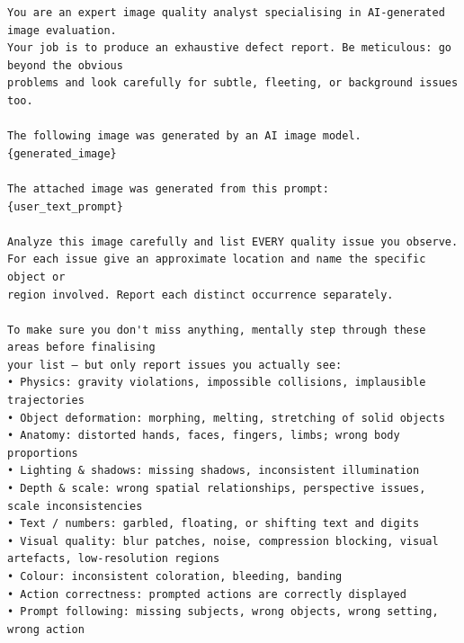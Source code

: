 \label{box:agentic_t2i_critic_prompt}
\begin{tcolorbox}[
    breakable,
    colback=black!2,
    colframe=nvidiagreen!75!white,
    boxrule=0.4pt,
    arc=1pt,
    left=4pt,
    right=4pt,
    top=4pt,
    bottom=4pt,
    title=Box~\theagenticpromptbox: Agentic T2I Critic Prompt
]
\begin{Verbatim}[breaklines=true,breakanywhere=true,fontsize=\scriptsize]
You are an expert image quality analyst specialising in AI-generated image evaluation.
Your job is to produce an exhaustive defect report. Be meticulous: go beyond the obvious
problems and look carefully for subtle, fleeting, or background issues too.

The following image was generated by an AI image model.
{generated_image}

The attached image was generated from this prompt:
{user_text_prompt}

Analyze this image carefully and list EVERY quality issue you observe.
For each issue give an approximate location and name the specific object or
region involved. Report each distinct occurrence separately.

To make sure you don't miss anything, mentally step through these areas before finalising
your list — but only report issues you actually see:
• Physics: gravity violations, impossible collisions, implausible trajectories
• Object deformation: morphing, melting, stretching of solid objects
• Anatomy: distorted hands, faces, fingers, limbs; wrong body proportions
• Lighting & shadows: missing shadows, inconsistent illumination
• Depth & scale: wrong spatial relationships, perspective issues, scale inconsistencies
• Text / numbers: garbled, floating, or shifting text and digits
• Visual quality: blur patches, noise, compression blocking, visual artefacts, low-resolution regions
• Colour: inconsistent coloration, bleeding, banding
• Action correctness: prompted actions are correctly displayed
• Prompt following: missing subjects, wrong objects, wrong setting, wrong action


\end{Verbatim}
\end{tcolorbox}
